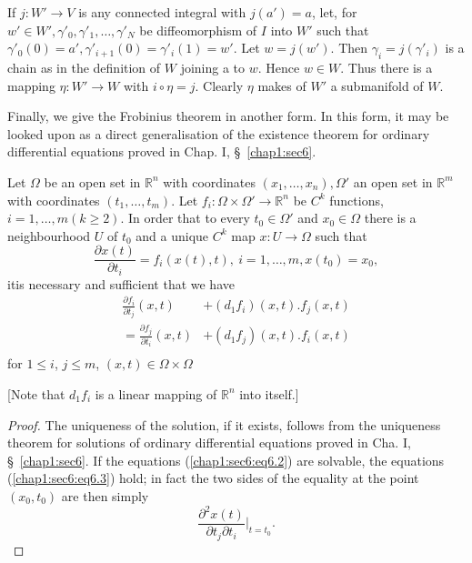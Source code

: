 If $j:W' \to V$ is any connected integral with $j(a')=a$, let, for $w'
\in W', \gamma'_0, \gamma'_1, \ldots, \gamma'_N$ be diffeomorphism of
$I$ into $W'$ such that $\gamma'_0 (0) = a', \gamma'_{i+1}(0) =
\gamma'_i (1) = w'$. Let $w = j(w')$. Then $\gamma_i = j(\gamma'_i)$
is a chain as in the definition of $W$ joining a to $w$. Hence $w \in
W$. Thus there is a mapping $\eta : W' \to W$ with $i \circ \eta =
j$. Clearly $\eta$ makes of $W'$ a submanifold of $W$. 

Finally, we give the Frobinius theorem in another form. In this form,
it may be looked upon as a direct generalisation of the existence
theorem for ordinary differential equations proved in Chap. I,
\S\ \ref{chap1:sec6}. 

\setcounter{theorem}{3}
\begin{theorem}\label{chap2:sec6:thm4} %
  Let $\Omega$ be an open set in $\mathbb{R}^n$ with coordinates
  $(x_1, \ldots, x_n), \Omega'$ an open set in $\mathbb{R}^m$ with
  coordinates $(t_1, \ldots,t_m)$. Let $f_i: \Omega \times \Omega' \to
  \mathbb{R}^n$ be $C^k$ functions, $i = 1, \ldots, m(k \geq 2)$. In
  order that to every $t_0 \in \Omega'$ and $x_0 \in \Omega$  there is
  a neighbourhood $U$ of $t_0$ and a unique $C^k$ map 
  $ x : U \to \Omega$ such that 
  \begin{equation*}
    \frac{\partial x(t)}{\partial t_i}= f_i (x(t), t),~ i=1, \ldots, m,
    x(t_0) = x_0, \tag{6.2}\label{chap2:sec6:eq6.2} 
  \end{equation*}
  it\pageoriginale is necessary and sufficient that we have
  \begin{align*}
    \frac{\partial f_i}{\partial t_j} (x,t) & + (d_1 f_i) (x,t). f_j (x, t)\\
    =\frac{\partial f_j}{\partial t_i} (x,t) & + (d_1 f_j) (x,t). f_i (x, t)\\
  \end{align*}
  for $1 \leq i$, $j \leq m$, $(x, t) \in \Omega \times \Omega $
\end{theorem}

[Note that $d_1 f_i$ is a linear mapping of $\mathbb{R}^n$ into itself.]
\begin{proof}
  The uniqueness of the solution, if it exists, follows from the
  uniqueness theorem for solutions of ordinary differential equations
  pro\-ved in Cha. I, \S\ \ref{chap1:sec6}. If the equations
  (\ref{chap1:sec6:eq6.2}) are solvable, the
  equations (\ref{chap1:sec6:eq6.3}) hold; in fact the two sides of
  the equality at the 
  point $(x_0, t_0)$ are then simply 
  $$
  \frac{\partial^2 x(t)}{\partial t_j \partial t_i} \bigg|_{t=t_0}.
  $$
\end{proof}

